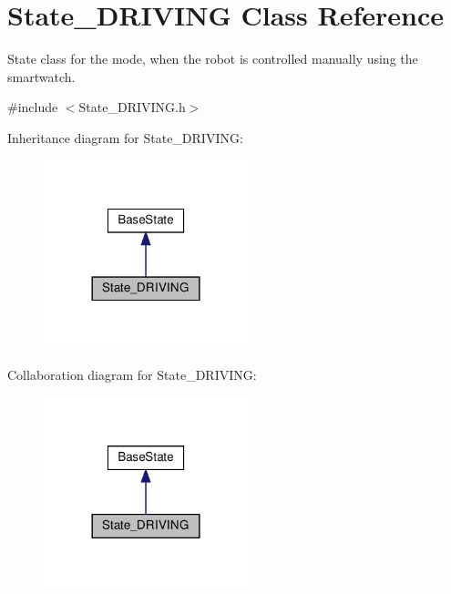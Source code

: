 \hypertarget{class_state___d_r_i_v_i_n_g}{}\section{State\+\_\+\+D\+R\+I\+V\+I\+NG Class Reference}
\label{class_state___d_r_i_v_i_n_g}


State class for the mode, when the robot is controlled manually using the smartwatch.  




{\ttfamily \#include $<$State\+\_\+\+D\+R\+I\+V\+I\+N\+G.\+h$>$}



Inheritance diagram for State\+\_\+\+D\+R\+I\+V\+I\+NG\+:
\nopagebreak
\begin{figure}[H]
\begin{center}
\leavevmode
\includegraphics[width=168pt]{class_state___d_r_i_v_i_n_g__inherit__graph}
\end{center}
\end{figure}


Collaboration diagram for State\+\_\+\+D\+R\+I\+V\+I\+NG\+:
\nopagebreak
\begin{figure}[H]
\begin{center}
\leavevmode
\includegraphics[width=168pt]{class_state___d_r_i_v_i_n_g__coll__graph}
\end{center}
\end{figure}
